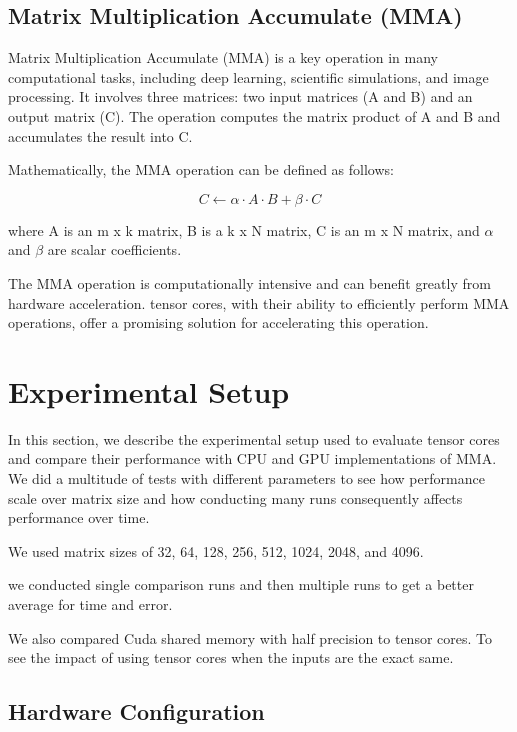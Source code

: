 \documentclass[conference]{IEEEtran}
\begin{document}
  \subsection{Matrix Multiplication Accumulate (MMA)}\label{sec:mma}
  
  Matrix Multiplication Accumulate (MMA) is a key operation in many computational tasks, including deep 
  learning, scientific simulations, and image processing. It involves three matrices: two input matrices 
  (A and B) and an output matrix (C). The operation computes the matrix product of A and B and accumulates 
  the result into C.
  
  Mathematically, the MMA operation can be defined as follows:
  
  \[ C \leftarrow \alpha \cdot A \cdot B + \beta \cdot C \]
  
  where A is an m x k matrix, B is a k x N matrix, C is an m x N matrix, and $\alpha$ and $\beta$ are scalar coefficients.
  
  The MMA operation is computationally intensive and can benefit greatly from hardware acceleration. 
  tensor cores, with their ability to efficiently perform MMA operations, offer a promising solution 
  for accelerating this operation.
  
  \section{Experimental Setup}\label{sec:experimental-setup}
  
  In this section, we describe the experimental setup used to evaluate 
  tensor cores and compare their performance with CPU and GPU implementations of MMA.
  We did a multitude of tests with different parameters to see how performance scale over matrix size
  and how conducting many runs consequently affects performance over time.

  We used matrix sizes of 32, 64, 128, 256, 512, 1024, 2048, and 4096.

  we conducted single comparison runs and then multiple runs to get a better average for time and error.
  
  We also compared Cuda shared memory with half precision to tensor cores. To see the impact of using tensor cores
  when the inputs are the exact same.

  \subsection{Hardware Configuration}\label{sec:hardware-configuration}
  
\end{document}
